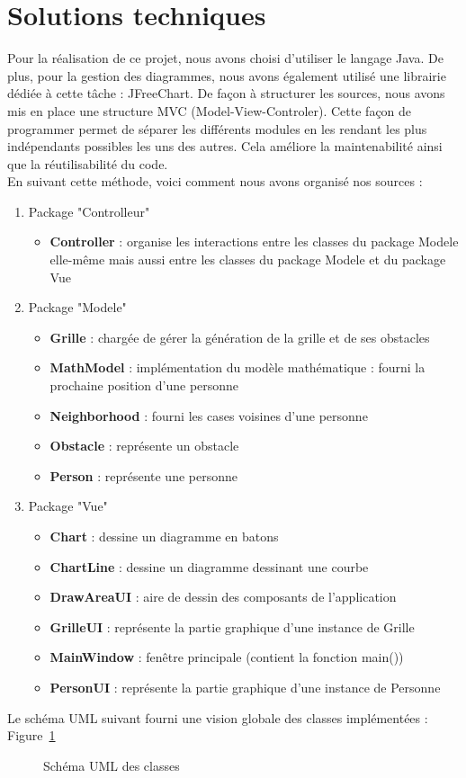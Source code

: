 \section{Solutions techniques}
	Pour la réalisation de ce projet, nous avons choisi d'utiliser le langage Java. De plus, pour la gestion des diagrammes, nous avons également utilisé une librairie dédiée à cette tâche : JFreeChart. De façon à structurer les sources, nous avons mis en place une structure MVC (Model-View-Controler). Cette façon de programmer permet de séparer les différents modules en les rendant les plus indépendants possibles les uns des autres. Cela améliore la maintenabilité ainsi que la réutilisabilité du code.\\
	En suivant cette méthode, voici comment nous avons organisé nos sources :
	
	\begin{enumerate}
		\item Package "Controlleur"
		\begin{itemize}
			\item \textbf{Controller} : organise les interactions entre les classes du package Modele elle-même mais aussi entre les classes du package Modele et du package Vue
		\end{itemize}
		
		\item Package "Modele"
		\begin{itemize}
			\item \textbf{Grille} : chargée de gérer la génération de la grille et de ses obstacles
			\item \textbf{MathModel} : implémentation du modèle mathématique : fourni la prochaine position d'une personne
			\item \textbf{Neighborhood} : fourni les cases voisines d'une personne
			\item \textbf{Obstacle} : représente un obstacle
			\item \textbf{Person} : représente une personne
		\end{itemize}
		
		\item Package "Vue"
		\begin{itemize}
			\item \textbf{Chart} : dessine un diagramme en batons
			\item \textbf{ChartLine} : dessine un diagramme dessinant une courbe
			\item \textbf{DrawAreaUI} : aire de dessin des composants de l'application
			\item \textbf{GrilleUI} : représente la partie graphique d'une instance de Grille 
			\item \textbf{MainWindow} : fenêtre principale (contient la fonction main())
			\item \textbf{PersonUI} : représente la partie graphique d'une instance de Personne
		\end{itemize}
	\end{enumerate}	
	
	Le schéma UML suivant fourni une vision globale des classes implémentées : Figure~\ref{fig:uml}\\
	
%	
	
	\begin{figure}[!H]
	\centering
	
	\caption{Schéma UML des classes\label{fig:uml}}
	\end{figure}
	
	